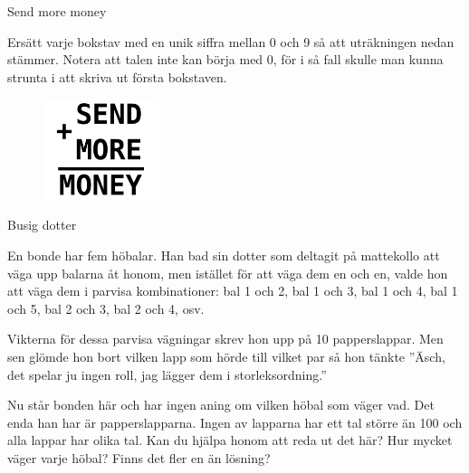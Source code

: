 \documentclass[10pt]{beamer}
\begin{document}
\begin{frame}{Send more money}

Ersätt varje bokstav med en unik siffra mellan 0 och 9 så att uträkningen nedan stämmer. Notera att talen inte kan börja med 0, för i så fall skulle man kunna strunta i att skriva ut första bokstaven. 

\begin{figure}[!ht]
\centering
\includegraphics[width=0.3\textwidth]{sendmoremoney}
\label{sendmoremoney}
\end{figure}

\end{frame}







\begin{frame}{Busig dotter}

En bonde har fem höbalar. Han bad sin dotter som deltagit på mattekollo att väga upp balarna åt honom, men istället för att väga dem en och en, valde hon att väga dem i parvisa kombinationer: bal 1 och 2, bal 1 och 3, bal 1 och 4, bal 1 och 5, bal 2 och 3, bal 2 och 4, osv. 

Vikterna för dessa parvisa vägningar skrev hon upp på 10 papperslappar. Men sen glömde hon bort vilken lapp som hörde till vilket par så hon tänkte ''Äsch, det spelar ju ingen roll, jag lägger dem i storleksordning.''

Nu står bonden här och har ingen aning om vilken höbal som väger vad. Det enda han har är papperslapparna. Ingen av lapparna har ett tal större än 100 och alla lappar har olika tal. Kan du  hjälpa honom att reda ut det här? Hur mycket väger varje höbal? Finns det fler en än lösning? 

\end{frame}
\end{document}

